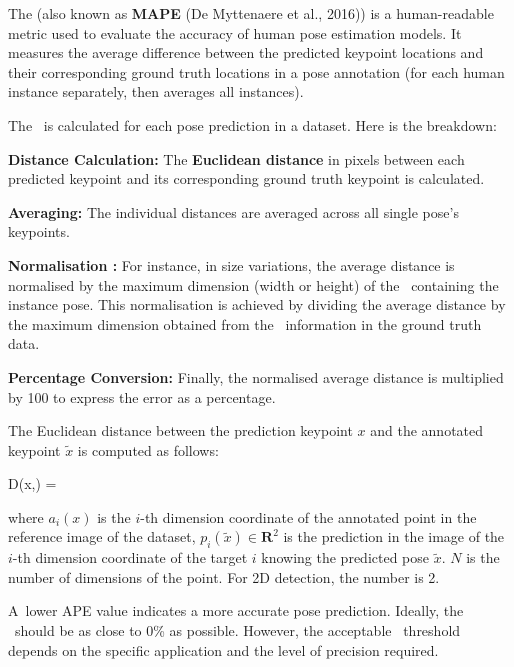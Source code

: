 The {\bf \APE} (also known as {\bf MAPE} (\scc De Myttenaere et al., 2016)) is a human-readable metric used to evaluate the accuracy of human pose estimation models. It measures the average difference between the predicted keypoint locations and their corresponding ground truth locations in a pose annotation (for each human instance separately, then averages all instances).

The \APE\ is calculated for each pose prediction in a dataset. Here is the breakdown:

\startitemize[n]
 \item {\bf Distance Calculation:} The {\bf Euclidean distance} in pixels between each predicted keypoint and its corresponding ground truth keypoint is calculated.
 \item {\bf Averaging:} The individual distances are averaged across all single pose's keypoints.
 \item {\bf Normalisation :} For instance, in size variations, the average distance is normalised by the maximum dimension (width or height) of the \BBOX\ containing the instance pose. This normalisation is achieved by dividing the average distance by the maximum dimension obtained from the \BBOX\ information in the ground truth data.
 \item {\bf Percentage Conversion:} Finally, the normalised average distance is multiplied by 100 to express the error as a percentage.
\stopitemize

The Euclidean distance between the prediction keypoint $ x $ and the annotated keypoint $ \tilde{x}$ is computed as follows:

\startplaceformula[reference=formula:euclidean-distance]
 \startformula D(x,) = 
 \stopformula
\stopplaceformula

where $ a_i (x) $ is the $ i $-th dimension coordinate of the annotated point in the reference image of the dataset, $ p_i (\tilde{x}) \in \mathbf R^2 $ is the prediction in the image of the $ i $-th dimension coordinate of the target $ i $ knowing the predicted pose $ \tilde{x} $. $ N $ is the number of dimensions of the point. For 2D detection, the number is 2.

A~lower APE value indicates a more accurate pose prediction. Ideally, the \APE\ should be as close to 0\% as possible. However, the acceptable \APE\ threshold depends on the specific application and the level of precision required.

